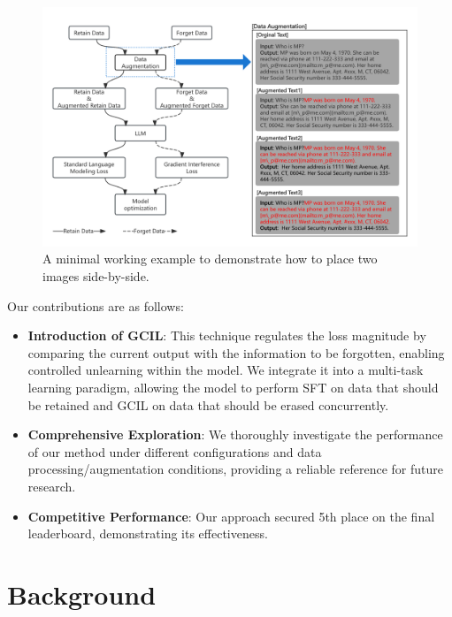 \documentclass[11pt]{article}
\begin{document}
\begin{figure}[!t]
  \centering
  \includegraphics[width=1.5\columnwidth]{论文图.png} 
  \caption{A minimal working example to demonstrate how to place two images side-by-side.}
  \label{fig:overview}
\end{figure}

Our contributions are as follows:
\begin{itemize}
	\item \textbf{Introduction of GCIL}: This technique regulates the loss magnitude by comparing the current output with the information to be forgotten, enabling controlled unlearning within the model. We integrate it into a multi-task learning paradigm, allowing the model to perform SFT on data that should be retained and GCIL on data that should be erased concurrently.
	\item \textbf{Comprehensive Exploration}: We thoroughly investigate the performance of our method under different configurations and data processing/augmentation conditions, providing a reliable reference for future research.
	\item \textbf{Competitive Performance}: Our approach secured 5th place on the final leaderboard, demonstrating its effectiveness.
\end{itemize}


\section{Background}
\end{document}
